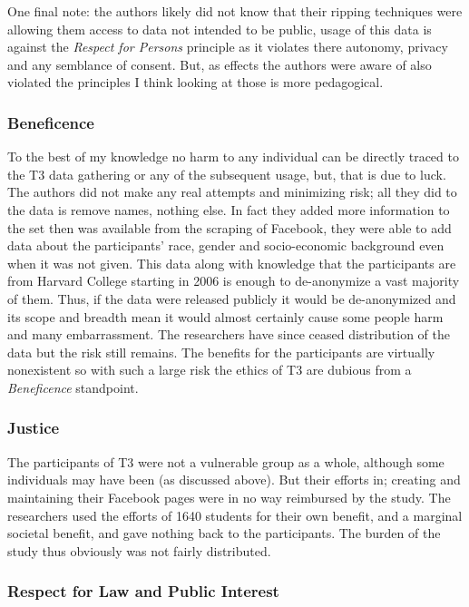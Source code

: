 \documentclass[10pt,a4paper,twocolumn]{article}
\begin{document}
One final note: the authors likely did not know that their ripping techniques were allowing them access to data not intended to be public\cite{zimmerblog}, usage of this data is against the \textit{Respect for Persons} principle as it violates there autonomy, privacy and any semblance of consent. But, as effects the authors were aware of also violated the principles I think looking at those is more pedagogical. 

\subsubsection*{Beneficence}

To the best of my knowledge no harm to any individual can be directly traced to the T3 data gathering or any of the subsequent usage, but, that is due to luck. The authors did not make any real attempts and minimizing risk; all they did to the data is remove names\cite{t3}, nothing else. In fact they added more information to the set then was available from the scraping of Facebook, they were able to add data about the participants' race, gender and socio-economic background even when it was not given\cite{t3}. This data along with knowledge that the participants are from Harvard College starting in 2006 is enough to de-anonymize a vast majority of them\cite{bitbybit}. Thus, if the data were released publicly it would be de-anonymized and its scope and breadth mean it would almost certainly cause some people harm and many embarrassment. The researchers have since ceased distribution of the data but the risk still remains. The benefits for the participants are virtually nonexistent so with such a large risk the ethics of T3 are dubious from a \textit{Beneficence} standpoint.

\subsubsection*{Justice}

The participants of T3 were not a vulnerable group as a whole, although some individuals may have been (as discussed above). But their efforts in; creating and maintaining their Facebook pages were in no way reimbursed by the study. The researchers used the efforts of 1640 students for their own benefit, and a marginal societal benefit, and gave nothing back to the participants. The burden of the study thus obviously was not fairly distributed.

\subsubsection*{Respect for Law and Public Interest}
\end{document}
